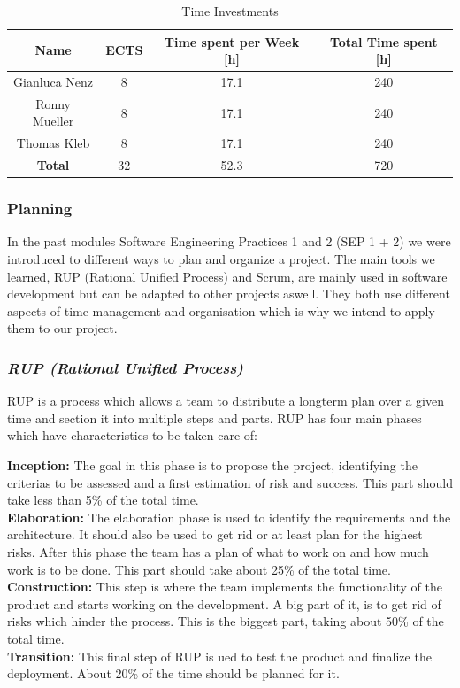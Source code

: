 \begin{table}
    \centering
    \begin{tabular}{||c c c c||} 
        \hline
        Name & ECTS & Time spent per Week [h] & Total Time spent [h]\\ [0.5ex] 
        \hline\hline
        Gianluca Nenz & 8 & 17.1 & 240 \\ 
        \hline
        Ronny Mueller & 8 & 17.1 & 240 \\
        \hline
        Thomas Kleb & 8 & 17.1 & 240 \\ 
        \hline
        \textbf{Total} & 32 & 52.3 & 720 \\[1ex] 
        \hline
    \end{tabular}
    \caption{Time Investments}
    \label{time_ects}
\end{table}

\subsubsection*{Planning}
In the past modules Software Engineering Practices 1 and 2 (SEP 1 + 2) we were introduced to different ways to plan and organize a project. The main tools we learned, RUP (Rational Unified Process) and Scrum, are mainly used in software development but can be adapted to other projects aswell. They both use different aspects of time management and organisation which is why we intend to apply them to our project.

\subsubsection*{\textit{RUP (Rational Unified Process)}}
\label{rup_section}
RUP is a process which allows a team to distribute a longterm plan over a given time and section it into multiple steps and parts. RUP has four main phases which have characteristics to be taken care of: \\

\vspace{0.2cm}

\noindent \textbf{Inception:} The goal in this phase is to propose the project, identifying the criterias to be assessed and a first estimation of risk and success. This part should take less than 5\% of the total time.\\
\textbf{Elaboration:} The elaboration phase is used to identify the requirements and the architecture. It should also be used to get rid or at least plan for the highest risks. After this phase the team has a plan of what to work on and how much work is to be done. This part should take about 25\% of the total time. \\
\textbf{Construction:} This step is where the team implements the functionality of the product and starts working on the development. A big part of it, is to get rid of risks which hinder the process. This is the biggest part, taking about 50\% of the total time.\\
\textbf{Transition:} This final step of RUP is ued to test the product and finalize the deployment. About 20\% of the time should be planned for it.\\

